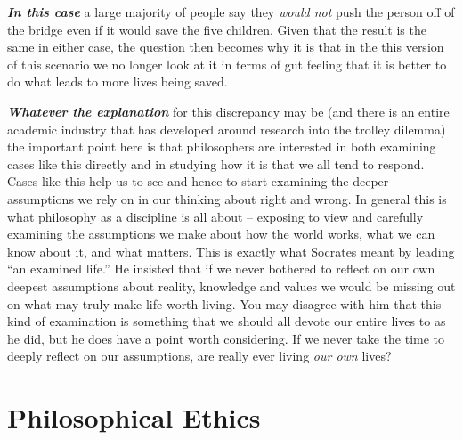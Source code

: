 \documentclass[
  12pt, openany]{book}
\theoremstyle{definition}
\theoremstyle{definition}
\theoremstyle{definition}
\theoremstyle{remark}
\begin{document}
\textbf{\emph{In this case}} a large majority of people say they \emph{would not} push the person off of the bridge even if it would save the five children. Given that the result is the same in either case, the question then becomes why it is that in the this version of this scenario we no longer look at it in terms of gut feeling that it is better to do what leads to more lives being saved.

\textbf{\emph{Whatever the explanation}} for this discrepancy may be (and there is an entire academic industry that has developed around research into the trolley dilemma) the important point here is that philosophers are interested in both examining cases like this directly and in studying how it is that we all tend to respond. Cases like this help us to see and hence to start examining the deeper assumptions we rely on in our thinking about right and wrong. In general this is what philosophy as a discipline is all about -- exposing to view and carefully examining the assumptions we make about how the world works, what we can know about it, and what matters. This is exactly what Socrates meant by leading ``an examined life.'' He insisted that if we never bothered to reflect on our own deepest assumptions about reality, knowledge and values we would be missing out on what may truly make life worth living. You may disagree with him that this kind of examination is something that we should all devote our entire lives to as he did, but he does have a point worth considering. If we never take the time to deeply reflect on our assumptions, are really ever living \emph{our own} lives?

\hypertarget{philosophical-ethics}{%
\section{Philosophical Ethics}\label{philosophical-ethics}}
\end{document}
